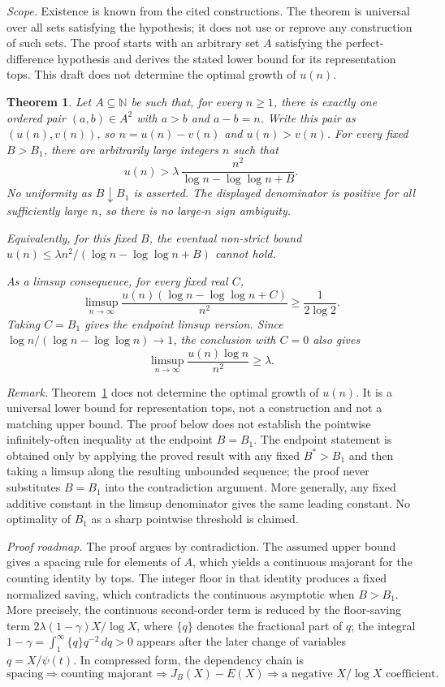 \documentclass[11pt]{article}
\newtheorem{theorem}{Theorem}
\newcommand{\N}{\mathbb{N}}
\begin{document}
\medskip
\noindent\textit{Scope.} Existence is known from the cited constructions. The theorem is universal
over all sets satisfying the hypothesis; it does not use or reprove any construction of such sets.
The proof starts with an arbitrary set $A$ satisfying the perfect-difference hypothesis and derives
the stated lower bound for its representation tops. This draft does not determine the optimal
growth of $u(n)$.

\begin{theorem}\label{thm:main}
Let $A\subseteq\N$ be such that, for every $n\ge 1$, there is exactly one ordered pair
$(a,b)\in A^2$ with $a>b$ and $a-b=n$. Write this pair as $(u(n),v(n))$, so
$n=u(n)-v(n)$ and $u(n)>v(n)$.
For every fixed $B>B_1$, there are arbitrarily large integers $n$ such that
\[
 u(n)>
 \lambda\,
 \frac{n^2}{\log n-\log\log n+B}.
\]
No uniformity as $B\downarrow B_1$ is asserted. The displayed denominator is positive for all
sufficiently large $n$, so there is no large-$n$ sign ambiguity.

Equivalently, for this fixed $B$, the eventual non-strict bound
$u(n)\le \lambda n^2/(\log n-\log\log n+B)$ cannot hold.

As a limsup consequence, for every fixed real $C$,
\[
 \limsup_{n\to\infty}
 \frac{u(n)(\log n-\log\log n+C)}{n^2}
 \ge
 \frac1{2\log 2}.
\]
Taking $C=B_1$ gives the endpoint limsup version. Since
$\log n/(\log n-\log\log n)\to1$, the conclusion with $C=0$ also gives
\[
 \limsup_{n\to\infty}\frac{u(n)\log n}{n^2}
 \ge \lambda.
\]
\end{theorem}

\noindent\textit{Remark.} Theorem~\ref{thm:main} does not determine the optimal growth of $u(n)$.
It is a universal lower bound for representation tops, not a construction and not a matching
upper bound. The proof below does not establish the pointwise infinitely-often inequality at the
endpoint $B=B_1$. The endpoint statement is obtained only by applying the proved result with any fixed
$B^*>B_1$ and then taking a limsup along the resulting unbounded sequence; the proof never
substitutes $B=B_1$ into the contradiction argument. More generally, any fixed additive constant
in the limsup denominator gives the same leading constant. No optimality of $B_1$ as a sharp
pointwise threshold is claimed.

\noindent\textit{Proof roadmap.} The proof argues by contradiction. The assumed upper bound
gives a spacing rule for elements of $A$, which yields a continuous majorant for the counting
identity by tops. The integer floor in that identity produces a fixed normalized saving, which
contradicts the continuous asymptotic when $B>B_1$. More precisely, the continuous second-order
term is reduced by the floor-saving term $2\lambda(1-\gamma)X/\log X$, where
$\{q\}$ denotes the fractional part of $q$; the integral
$1-\gamma=\int_1^\infty \{q\}q^{-2}\,dq>0$ appears after the later change of variables
$q=X/\psi(t)$. In compressed form, the dependency chain is
\[
\text{spacing}\Rightarrow\text{counting majorant}\Rightarrow J_B(X)-E(X)
\Rightarrow\text{a negative }X/\log X\text{ coefficient}.
\]
\end{document}
